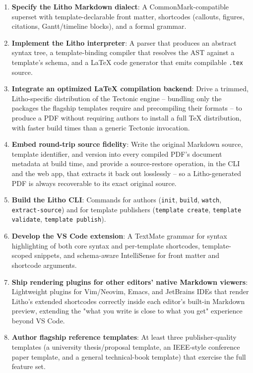 \documentclass[a4paper,twoside]{article}
\begin{document}
\begin{enumerate}
  \item \textbf{Specify the Litho Markdown dialect}: A CommonMark-compatible superset with template-declarable front matter, shortcodes (callouts, figures, citations, Gantt/timeline blocks), and a formal grammar.
  \item \textbf{Implement the Litho interpreter}: A parser that produces an abstract syntax tree, a template-binding compiler that resolves the AST against a template's schema, and a LaTeX code generator that emits compilable \texttt{.tex} source.
  \item \textbf{Integrate an optimized LaTeX compilation backend}: Drive a trimmed, Litho-specific distribution of the Tectonic engine -- bundling only the packages the flagship templates require and precompiling their formats -- to produce a PDF without requiring authors to install a full TeX distribution, with faster build times than a generic Tectonic invocation.
  \item \textbf{Embed round-trip source fidelity}: Write the original Markdown source, template identifier, and version into every compiled PDF's document metadata at build time, and provide a source-restore operation, in the CLI and the web app, that extracts it back out losslessly -- so a Litho-generated PDF is always recoverable to its exact original source.
  \item \textbf{Build the Litho CLI}: Commands for authors (\texttt{init}, \texttt{build}, \texttt{watch}, \texttt{extract-source}) and for template publishers (\texttt{template create}, \texttt{template validate}, \texttt{template publish}).
  \item \textbf{Develop the VS Code extension}: A TextMate grammar for syntax highlighting of both core syntax and per-template shortcodes, template-scoped snippets, and schema-aware IntelliSense for front matter and shortcode arguments.
  \item \textbf{Ship rendering plugins for other editors' native Markdown viewers}: Lightweight plugins for Vim/Neovim, Emacs, and JetBrains IDEs that render Litho's extended shortcodes correctly inside each editor's built-in Markdown preview, extending the "what you write is close to what you get" experience beyond VS Code.
  \item \textbf{Author flagship reference templates}: At least three publisher-quality templates (a university thesis/proposal template, an IEEE-style conference paper template, and a general technical-book template) that exercise the full feature set.

\end{enumerate}
\end{document}
